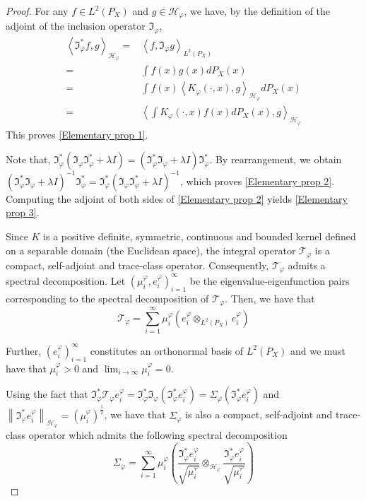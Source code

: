 \documentclass{article} %
\newcommand{\I}{\mathfrak{I}}
\newcommand{\rep}{\varphi}
\newcommand{\Hrep}{\mathcal{H}_{\varphi}}
\newcommand{\Srep}{\Sigma_{\rep}}
\newcommand{\Trep}{\mathcal{T}_{\rep}}
\newcommand{\Irep}{\I_{\rep}}
\newcommand{\Irepad}{\Irep^{*}}
\newcommand{\norm}[1]{\left\|#1\right\|}
\newcommand{\inprod}[1]{\left \langle #1 \right\rangle}
\newcommand{\LPtwo}{L^{2}(P_{X})}
\theoremstyle{plain}
\begin{document}
\begin{proof}
    For any $f \in \LPtwo$ and $g \in \Hrep$, we have, by the definition of the adjoint of the inclusion operator $\Irep$,
    \begin{equation*}
    \begin{aligned}
        \inprod{\Irepad f, g}_{\Hrep} =& \inprod{f, \Irep g}_{\LPtwo}\\
        =& \int f(x)g(x)dP_{X}(x)\\
        =& \int f(x)\inprod{K_{\rep}(\cdot,x),g}_{\Hrep}dP_{X}(x)\\
        =& \inprod{\int K_{\rep}(\cdot,x) f(x)dP_{X}(x),g}_{\Hrep}
    \end{aligned}
    \end{equation*}
    This proves \ref{Elementary prop 1}.
    
    Note that, $\Irepad (\Irep \Irepad + \lambda I) = (\Irepad \Irep + \lambda I)\Irepad$. By rearrangement, we obtain $(\Irepad \Irep + \lambda I)^{-1} \Irepad = \Irepad (\Irep \Irepad + \lambda I)^{-1}$, which proves \ref{Elementary prop 2}. Computing the adjoint of both sides of \ref{Elementary prop 2} yields \ref{Elementary prop 3}.

    Since $K$ is a positive definite, symmetric, continuous and bounded kernel defined on a separable domain (the Euclidean space), the integral operator $\Trep$ is a compact, self-adjoint and trace-class operator. Consequently, $\Trep$ admits a spectral decomposition. Let $\left(\mu_{i}^{\rep},e_{i}^{\rep}\right)_{i=1}^{\infty}$ be the eigenvalue-eigenfunction pairs corresponding to the spectral decomposition of $\Trep$.
    Then, we have that
    \begin{equation*}\label{Spectral decomposition of Trep}
        \Trep = \sum_{i=1}^{\infty} \mu_{i}^{\rep} \left(e_{i}^{\rep} \otimes_{\LPtwo} e_{i}^{\rep}\right)
    \end{equation*}
    
    Further, $(e_{i}^{\rep})_{i=1}^{\infty}$ constitutes an orthonormal basis of $\LPtwo$ and we must have that $\mu_{i}^{\rep} > 0$ and $\lim_{i \to \infty} \mu_{i}^{\rep} = 0$.

    Using the fact that $\Irepad \Trep e_{i}^{\rep} = \Irepad \Irep (\Irepad e_{i}^{\rep}) = \Srep (\Irepad e_{i}^{\rep})$ and $\norm{\Irepad e_{i}^{\rep}}_{\Hrep} = (\mu_{i}^{\rep})^{\frac{1}{2}}$, we have that $\Srep$ is also a compact, self-adjoint and trace-class operator which admits the following spectral decomposition 
    \begin{equation*}\label{Spectral decomposition of Srep}
        \Srep = \sum_{i=1}^{\infty} \mu_{i}^{\rep} \left(\frac{\Irepad e_{i}^{\rep}}{\sqrt{\mu_{i}^{\rep}}} \otimes_{\Hrep} \frac{\Irepad e_{i}^{\rep}}{\sqrt{\mu_{i}^{\rep}}}\right)
    \end{equation*}


\end{proof}
\end{document}
